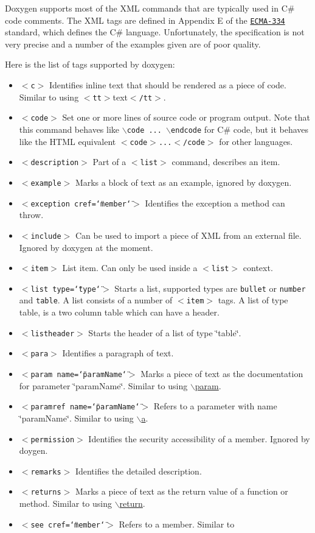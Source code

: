 Doxygen supports most of the XML commands that are typically used in C\# code comments. The XML tags are defined in Appendix E of the \href{http://www.ecma-international.org/publications/standards/Ecma-334.htm}{\tt ECMA-334} standard, which defines the C\# language. Unfortunately, the specification is not very precise and a number of the examples given are of poor quality.

Here is the list of tags supported by doxygen:

\begin{itemize}
\item {\tt $<$c$>$} Identifies inline text that should be rendered as a piece of code. Similar to using {\tt $<$tt$>$}text{\tt $<$/tt$>$}. \item {\tt $<$code$>$} Set one or more lines of source code or program output. Note that this command behaves like {\tt $\backslash$code ... $\backslash$endcode} for C\# code, but it behaves like the HTML equivalent {\tt $<$code$>$...$<$/code$>$} for other languages. \item {\tt $<$description$>$} Part of a {\tt $<$list$>$} command, describes an item. \item {\tt $<$example$>$} Marks a block of text as an example, ignored by doxygen. \item {\tt $<$exception cref=\char`\"{}member\char`\"{}$>$} Identifies the exception a method can throw. \item {\tt $<$include$>$} Can be used to import a piece of XML from an external file. Ignored by doxygen at the moment. \item {\tt $<$item$>$} List item. Can only be used inside a {\tt $<$list$>$} context. \item {\tt $<$list type=\char`\"{}type\char`\"{}$>$} Starts a list, supported types are {\tt bullet} or {\tt number} and {\tt table}. A list consists of a number of {\tt $<$item$>$} tags. A list of type table, is a two column table which can have a header. \item {\tt $<$listheader$>$} Starts the header of a list of type \char`\"{}table\char`\"{}. \item {\tt $<$para$>$} Identifies a paragraph of text. \item {\tt $<$param name=\char`\"{}paramName\char`\"{}$>$} Marks a piece of text as the documentation for parameter \char`\"{}paramName\char`\"{}. Similar to using \hyperlink{commands_cmdparam}{$\backslash$param}. \item {\tt $<$paramref name=\char`\"{}paramName\char`\"{}$>$} Refers to a parameter with name \char`\"{}paramName\char`\"{}. Similar to using \hyperlink{commands_cmda}{$\backslash$a}. \item {\tt $<$permission$>$} Identifies the security accessibility of a member. Ignored by doygen. \item {\tt $<$remarks$>$} Identifies the detailed description. \item {\tt $<$returns$>$} Marks a piece of text as the return value of a function or method. Similar to using \hyperlink{commands_cmdreturn}{$\backslash$return}. \item {\tt $<$see cref=\char`\"{}member\char`\"{}$>$} Refers to a member. Similar to 
\end{itemize}
